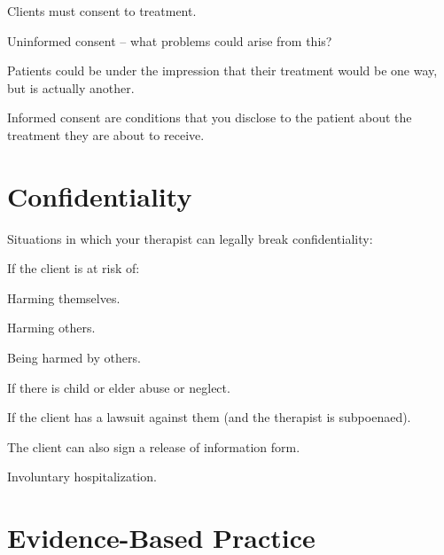 \begin{coloredlist}
    \item Clients must consent to treatment.
    \begin{coloredlist}
        \item Uninformed consent -- what problems could arise from this?
        \begin{coloredlist}
            \item Patients could be under the impression that their treatment would be one way, but is actually another.
        \end{coloredlist}
        \item Informed consent are conditions that you disclose to the patient about the treatment they are about to receive.
    \end{coloredlist}
\end{coloredlist}

\section{Confidentiality}

Situations in which your therapist can legally break confidentiality:
\begin{coloredlist}
    \item If the client is at risk of:
    \begin{coloredlist}
        \item Harming themselves.
        \item Harming others.
        \item Being harmed by others.
    \end{coloredlist}
    \item If there is child or elder abuse or neglect.
    \item If the client has a lawsuit against them (and the therapist is subpoenaed).
    \item The client can also sign a release of information form.
    \item Involuntary hospitalization.
\end{coloredlist}

\section{Evidence-Based Practice}

